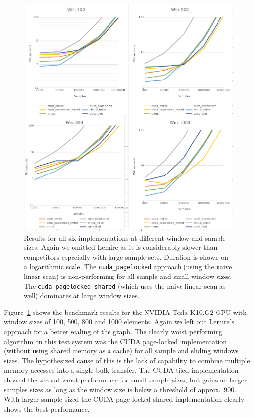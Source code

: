 \begin{figure}
    \centering
    \includegraphics[width=1.0\linewidth]{Figures/tesla_k10g2_ms_vs_samples.png}
    \caption{Results for all six implementations at different window and sample sizes. Again we omitted Lemire as it is considerably slower than competitors especially with large sample sets. Duration is shown on a logarithmic scale. The \texttt{cuda\_pagelocked} approach (using the naive linear scan) is non-performing for all sample and small window sizes. The \texttt{cuda\_pagelocked\_shared} (which uses the naive linear scan as well) dominates at large window sizes.}
    \label{fig:tesla_k10g2_ms_vs_samples}
\end{figure}

Figure~\ref{fig:tesla_k10g2_ms_vs_samples} shows the benchmark results for the NVIDIA Tesla K10.G2 GPU with window sizes of 100, 500, 800 and 1000 elements. Again we left out Lemire's approach for a better scaling of the graph. The clearly worst performing algorithm on this test system was the CUDA page-locked implementation (without using shared memory as a cache) for all sample and sliding windows sizes. The hypothesized cause of this is the lack of capability to combine multiple memory accesses into a single bulk transfer. The CUDA tiled implementation showed the second worst performance for small sample sizes, but gains on larger samples sizes as long as the window size is below a threshold of approx.\ 900. With larger sample sized the CUDA page-locked shared implementation clearly shows the best performance.

